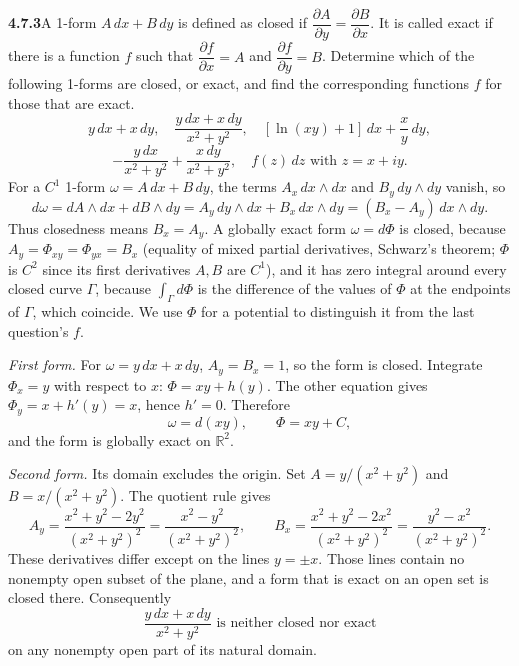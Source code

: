 \par\bigskip
\noindent\textbf{4.7.3}\quad A 1-form $A\,dx+B\,dy$ is defined as closed if
$\dfrac{\partial A}{\partial y}=\dfrac{\partial B}{\partial x}$. It is called
exact if there is a function $f$ such that $\dfrac{\partial f}{\partial x}=A$
and $\dfrac{\partial f}{\partial y}=B$. Determine which of the following
1-forms are closed, or exact, and find the corresponding functions $f$ for
those that are exact.
\[
y\,dx+x\,dy,\quad\frac{y\,dx+x\,dy}{x^{2}+y^{2}},\quad
[\ln(xy)+1]\,dx+\frac{x}{y}\,dy,
\]
\[
-\frac{y\,dx}{x^{2}+y^{2}}+\frac{x\,dy}{x^{2}+y^{2}},\quad
f(z)\,dz\text{ with }z=x+iy.
\]
\solution
For a $C^1$ 1-form $\omega=A\,dx+B\,dy$, the terms $A_x\,dx\wedge dx$
and $B_y\,dy\wedge dy$ vanish, so
\[
d\omega=dA\wedge dx+dB\wedge dy
=A_y\,dy\wedge dx+B_x\,dx\wedge dy
=(B_x-A_y)\,dx\wedge dy.
\]
Thus closedness means $B_x=A_y$. A globally exact form $\omega=d\Phi$
is closed, because $A_y=\Phi_{xy}=\Phi_{yx}=B_x$ (equality of mixed
partial derivatives, Schwarz's theorem; $\Phi$ is $C^2$ since
its first derivatives $A,B$ are $C^1$), and it has zero integral around
every closed curve $\Gamma$, because $\int_\Gamma d\Phi$ is the
difference of the values of $\Phi$ at the endpoints of $\Gamma$, which
coincide. We use
$\Phi$ for a potential to distinguish it from the last question's $f$.


\emph{First form.} For $\omega=y\,dx+x\,dy$, $A_y=B_x=1$, so the
form is closed. Integrate $\Phi_x=y$ with respect to $x$:
$\Phi=xy+h(y)$. The other equation gives
$\Phi_y=x+h'(y)=x$, hence $h'=0$. Therefore
\[
\boxed{\omega=d(xy),\qquad\Phi=xy+C},
\]
and the form is globally exact on $\mathbb R^2$.

\emph{Second form.} Its domain excludes the origin. Set
$A=y/(x^2+y^2)$ and $B=x/(x^2+y^2)$. The quotient rule gives
\[
A_y=\frac{x^2+y^2-2y^2}{(x^2+y^2)^2}
=\frac{x^2-y^2}{(x^2+y^2)^2},\qquad
B_x=\frac{x^2+y^2-2x^2}{(x^2+y^2)^2}
=\frac{y^2-x^2}{(x^2+y^2)^2}.
\]
These derivatives differ except on the lines $y=\pm x$. Those lines
contain no nonempty open subset of the plane, and a form that is exact
on an open set is closed there. Consequently
\[
\boxed{\frac{y\,dx+x\,dy}{x^2+y^2}\text{ is neither closed nor exact}}
\]
on any nonempty open part of its natural domain.

